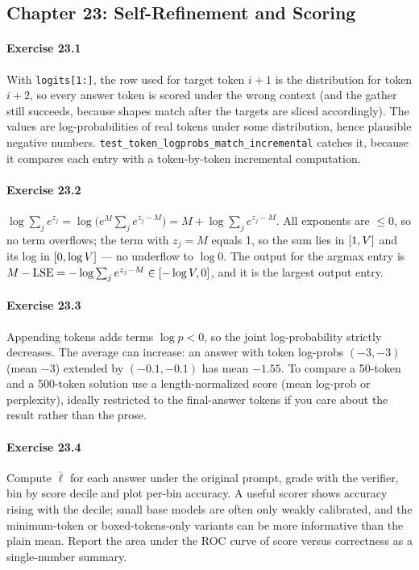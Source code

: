 \subsection*{Chapter 23: Self-Refinement and Scoring}

\paragraph{Exercise 23.1} With \texttt{logits[1:]}, the row used for target token $i{+}1$ is the
distribution for token $i{+}2$, so every answer token is scored under the wrong context (and the
gather still succeeds, because shapes match after the targets are sliced accordingly). The values are
log-probabilities of real tokens under some distribution, hence plausible negative numbers.
\texttt{test\_token\_logprobs\_match\_incremental} catches it, because it compares each entry with a
token-by-token incremental computation.

\paragraph{Exercise 23.2} $\log\sum_j e^{z_j} = \log\bigl(e^M\sum_j e^{z_j - M}\bigr) = M + \log\sum_j
e^{z_j-M}$. All exponents are $\le 0$, so no term overflows; the term with $z_j = M$ equals 1, so the
sum lies in $[1, V]$ and its log in $[0, \log V]$ --- no underflow to $\log 0$. The output for
the argmax entry is $M - \mathrm{LSE} = -\log\sum_j e^{z_j - M} \in [-\log V, 0]$, and it is the
largest output entry.

\paragraph{Exercise 23.3} Appending tokens adds terms $\log p < 0$, so the joint log-probability
strictly decreases. The average can increase: an answer with token log-probs $(-3, -3)$ (mean $-3$)
extended by $(-0.1, -0.1)$ has mean $-1.55$. To compare a 50-token and a 500-token solution use a
length-normalized score (mean log-prob or perplexity), ideally restricted to the final-answer tokens
if you care about the result rather than the prose.

\paragraph{Exercise 23.4} Compute $\bar\ell$ for each answer under the original prompt, grade with the
verifier, bin by score decile and plot per-bin accuracy. A useful scorer shows accuracy rising with
the decile; small base models are often only weakly calibrated, and the minimum-token or
boxed-tokens-only variants can be more informative than the plain mean. Report the area under the
ROC curve of score versus correctness as a single-number summary.

